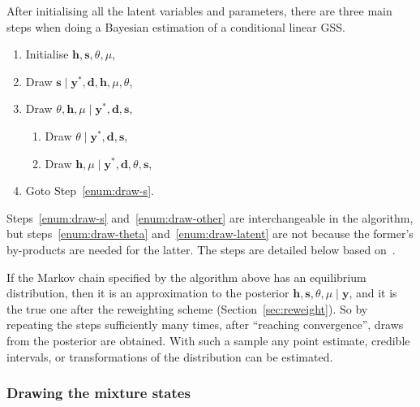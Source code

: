 After initialising all the latent variables and parameters, there are three main steps when doing a Bayesian estimation of a conditional linear GSS.
\begin{enumerate}[start=0]
	\item Initialise $\bm h,\bm s,\theta,\mu$,
	\item Draw $\bm{s}\mid\bm{y}^\ast,\bm{d},\bm{h},\mu,\theta$\label{enum:draw-s},
	\item Draw $\theta,\bm h,\mu\mid\bm y^\ast,\bm d,\bm s$\label{enum:draw-other},
	\begin{enumerate}
		\item Draw $\theta\mid\bm{y}^\ast,\bm{d},\bm s$\label{enum:draw-theta},
		\item Draw $\bm{h},\mu\mid\bm{y}^\ast,\bm{d},\theta,\bm s$\label{enum:draw-latent},
	\end{enumerate}
	\item Goto Step~\ref{enum:draw-s}.
\end{enumerate}
Steps~\ref{enum:draw-s} and~\ref{enum:draw-other} are interchangeable in the algorithm, but steps~\ref{enum:draw-theta} and~\ref{enum:draw-latent} are not because the former's by-products are needed for the latter.
The steps are detailed below based on~\citet{Omori2007}.

If the Markov chain specified by the algorithm above has an equilibrium distribution, then it is an approximation to the posterior $\bm h,\bm s,\theta,\mu\mid\bm y$, and it is the true one after the reweighting scheme (Section~\ref{sec:reweight}).
So by repeating the steps sufficiently many times, after ``reaching convergence'', draws from the posterior are obtained.
With such a sample any point estimate, credible intervals, or transformations of the distribution can be estimated.

\subsubsection{Drawing the mixture states}

